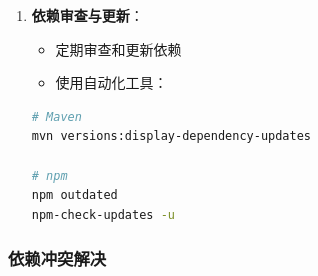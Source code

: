 \begin{enumerate}
\begin{lstlisting}
{
  "dependencies": {
    "vue": "3.2.37",
    "axios": "0.27.2"
  }
}
\end{lstlisting}

  \begin{itemize}
  \tightlist
  \item
    启用\passthrough{\lstinline!save-exact!}选项：
  \end{itemize}

\begin{lstlisting}[language=bash]
npm config set save-exact true
\end{lstlisting}
\item
  \textbf{依赖审查与更新}：

  \begin{itemize}
  \tightlist
  \item
    定期审查和更新依赖
  \item
    使用自动化工具：
  \end{itemize}

\begin{lstlisting}[language=bash]
# Maven
mvn versions:display-dependency-updates

# npm
npm outdated
npm-check-updates -u
\end{lstlisting}
\end{enumerate}

\subsubsection{依赖冲突解决}\label{ux4f9dux8d56ux51b2ux7a81ux89e3ux51b3}

